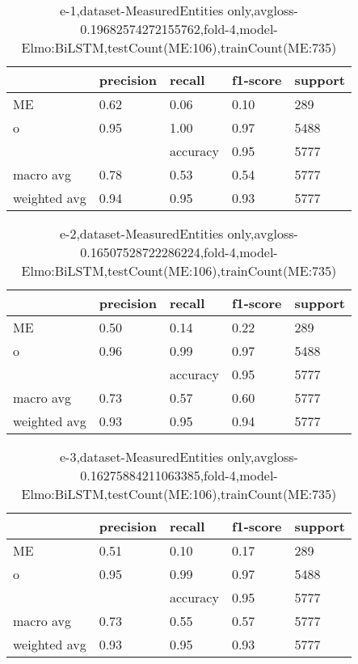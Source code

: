 \begin{table}[!ht] 
\centering
\caption{e-1,dataset-MeasuredEntities only,avgloss-0.19682574272155762,fold-4,model-Elmo:BiLSTM,testCount(ME:106),trainCount(ME:735)}\label{e-1data-meS.tsv}
\begin{tabularx}{300pt}{|X|X|X|X|X|}
\hline
&precision&recall&f1-score&support\\
\hline
ME&0.62&0.06&0.10&289\\
\hline
o&0.95&1.00&0.97&5488\\
\hline
&&accuracy&0.95&5777\\
\hline
macro avg&0.78&0.53&0.54&5777\\
\hline
weighted avg&0.94&0.95&0.93&5777\\
\hline
\end{tabularx}
\end{table}
\begin{table}[!ht] 
\centering
\caption{e-2,dataset-MeasuredEntities only,avgloss-0.16507528722286224,fold-4,model-Elmo:BiLSTM,testCount(ME:106),trainCount(ME:735)}\label{e-2data-meS.tsv}
\begin{tabularx}{300pt}{|X|X|X|X|X|}
\hline
&precision&recall&f1-score&support\\
\hline
ME&0.50&0.14&0.22&289\\
\hline
o&0.96&0.99&0.97&5488\\
\hline
&&accuracy&0.95&5777\\
\hline
macro avg&0.73&0.57&0.60&5777\\
\hline
weighted avg&0.93&0.95&0.94&5777\\
\hline
\end{tabularx}
\end{table}
\begin{table}[!ht] 
\centering
\caption{e-3,dataset-MeasuredEntities only,avgloss-0.16275884211063385,fold-4,model-Elmo:BiLSTM,testCount(ME:106),trainCount(ME:735)}\label{e-3data-meS.tsv}
\begin{tabularx}{300pt}{|X|X|X|X|X|}
\hline
&precision&recall&f1-score&support\\
\hline
ME&0.51&0.10&0.17&289\\
\hline
o&0.95&0.99&0.97&5488\\
\hline
&&accuracy&0.95&5777\\
\hline
macro avg&0.73&0.55&0.57&5777\\
\hline
weighted avg&0.93&0.95&0.93&5777\\
\hline
\end{tabularx}
\end{table}
